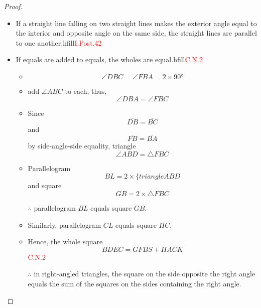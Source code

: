 \begin{proof}
\begin{itemize}
    \item If a straight line falling on two straight lines makes the exterior angle equal to the interior and opposite angle on the same side, the straight lines are parallel to one another.hfill\textcolor{red}{I.Post.42}
   
    
    \item If equals are added to equals, the wholes are equal.hfill\textcolor{red}{C.N.2}
    
    \begin{itemize}
    
    \item[]
    
    \item \[\angle{DBC} = \angle{FBA} = 2\times\ang{90}\]
    
        \item add $\angle {ABC}$ to each, thus, 
        \[\angle{DBA} = \angle{FBC}\]
        
        \item Since 
        \[\overline{DB} = \overline{BC}\] 
        and 
        \[\overline{FB} = \overline{BA}\]
        by side-angle-side equality, triangle 
        \[\angle{ABD} = \triangle{FBC}\]
        
        \item Parallelogram \[BL = 2\times\{triangle{ABD}\]
        and square 
        \[GB = 2\times \triangle{FBC}\] 
        
        \item[$\therefore$] parallelogram $BL$ equals square $GB$.
        
        \item Similarly, parallelogram $CL$ equals square $HC$.
        
        \item Hence, the whole square 
        \[BDEC = GFBS + HACK\]\hfill\textcolor{red}{C.N.2}
        
        \clearpage
    
    \item[$\therefore$] in right-angled triangles, the square on the side opposite the right angle equals the sum of the squares on the sides containing the right angle.
	\end{itemize}

\end{itemize}

\end{proof}

\clearpage